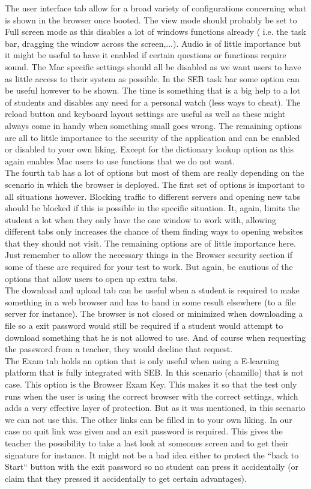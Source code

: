The user interface tab allow for a broad variety of configurations concerning what is shown in the browser once booted. The view mode should probably be set to Full screen mode as this disables a lot of windows functions already ( i.e. the task bar, dragging the window across the screen,...). Audio is of little importance but it might be useful to have it enabled if certain questions or functions require sound. The Mac specific settings should all be disabled as we want users to have as little access to their system as possible. In the SEB task bar some option can be useful however to be shown. The time is something that is a big help to a lot of students and disables any need for a personal watch (less ways to cheat). The reload button and keyboard layout settings are useful as well as these might always come in handy when something small goes wrong. The remaining options are all to little importance to the security of the application and can be enabled or disabled to your own liking. Except for the dictionary lookup option as this again enables Mac users to use functions that we do not want.\\
The fourth tab has a lot of options but most of them are really depending on the scenario in which the browser is deployed. The first set of options is important to all situations however. Blocking traffic to different servers and opening new tabs should be blocked if this is possible in the specific situation.  It, again, limits the student a lot when they only have the one window to work with, allowing different tabs only increases the chance of them finding ways to opening websites that they should not visit. The remaining options are of little importance here. Just remember to allow the necessary things in the Browser security section if some of these are required for your test to work. But again, be cautious of the options that allow users to open up extra tabs.\\
The download and upload tab can be useful when a student is required to make something in a web browser and has to hand in some result elsewhere (to a file server for instance). The browser is not closed or minimized when downloading a file so a exit password would still be required if a student would attempt to download something that he is not allowed to use. And of course when requesting the password from a teacher, they would decline that request.\\
The Exam tab holds an option that is only useful when using a E-learning platform that is fully integrated with SEB. In this scenario (chamillo) that is not case. This option is the Browser Exam Key. This makes it so that the test only runs when the user is using the correct browser with the correct settings,  which adds a very effective layer of protection. But as it was mentioned, in this scenario we can not use this. The other links can be filled in to your own liking. In our case no quit link was given and an exit password is required. This gives the teacher the possibility to take a last look at someones screen and to get their signature for instance. It might not be a bad idea either to protect the ``back to Start`` button with the exit password so no student can press it accidentally (or claim that they pressed it accidentally to get certain advantages).\\
